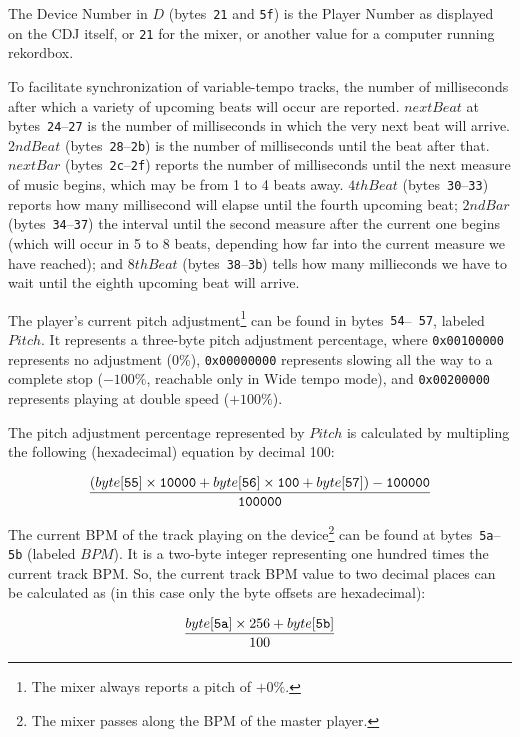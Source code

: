 \documentclass[11pt]{article}
\begin{document}
The Device Number in $D$ (bytes~{\tt 21} and {\tt 5f}) is the Player
Number as displayed on the CDJ itself, or {\tt 21} for the mixer, or
another value for a computer running rekordbox.

To facilitate synchronization of variable-tempo tracks, the number of
milliseconds after which a variety of upcoming beats will occur are
reported. $nextBeat$ at bytes~{\tt 24}--{\tt 27} is the number of
milliseconds in which the very next beat will arrive. $2ndBeat$
(bytes~{\tt 28}--{\tt 2b}) is the number of milliseconds until the
beat after that. $nextBar$ (bytes~{\tt 2c}--{\tt 2f}) reports the
number of milliseconds until the next measure of music begins, which
may be from 1 to 4 beats away. $4thBeat$ (bytes~{\tt 30}--{\tt 33})
reports how many millisecond will elapse until the fourth upcoming
beat; $2ndBar$ (bytes~{\tt 34}--{\tt 37}) the interval until the
second measure after the current one begins (which will occur in 5 to
8 beats, depending how far into the current measure we have reached);
and $8thBeat$ (bytes~{\tt 38}--{\tt 3b}) tells how many millieconds we
have to wait until the eighth upcoming beat will arrive.

The player's current pitch adjustment\footnote{The mixer always
  reports a pitch of $+0\%$.} can be found in bytes~{\tt 54}--{\tt
  57}, labeled $Pitch$. It represents a three-byte pitch adjustment
percentage, where {\tt 0x00100000} represents no adjustment ($0\%$),
{\tt 0x00000000} represents slowing all the way to a complete stop
($-100\%$, reachable only in Wide tempo mode), and {\tt 0x00200000}
represents playing at double speed ($+100\%$).

The pitch adjustment percentage represented by $Pitch$ is calculated
by multipling the following (hexadecimal) equation by decimal 100:

\begin{displaymath}
  \frac{(byte[{\tt 55}] \times {\tt 10000} + byte[{\tt 56}] \times
    {\tt 100} + byte[{\tt 57}]) - {\tt 100000}}{\tt 100000}
\end{displaymath}

The current BPM of the track playing on the device\footnote{The mixer
  passes along the BPM of the master player.} can be found at
bytes~{\tt 5a}--{\tt 5b} (labeled $BPM$). It is a two-byte integer
representing one hundred times the current track BPM. So, the current
track BPM value to two decimal places can be calculated as (in this
case only the byte offsets are hexadecimal):

\[ \frac{byte[{\tt 5a}] \times 256 + byte[{\tt 5b}]}{100} \]
\end{document}
